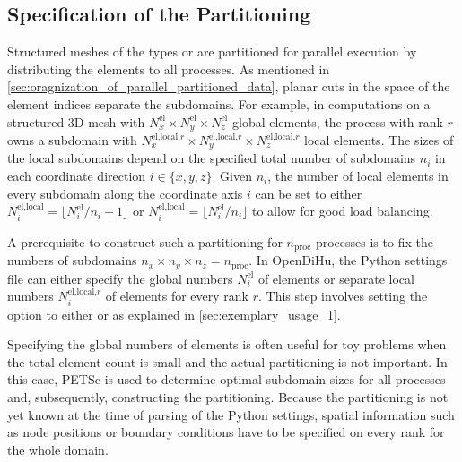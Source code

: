 \subsection{Specification of the Partitioning}\label{sec:algorithm_for_partitioning_and_sampling}

Structured meshes of the types  or  are partitioned for parallel execution by distributing the elements to all processes. As mentioned in \cref{sec:oragnization_of_parallel_partitioned_data}, planar cuts in the space of the element indices separate the subdomains. For example, in computations on a structured 3D mesh with $N_x^\text{el} \times N_y^\text{el} \times N_z^\text{el}$ global elements, the process with rank $r$ owns a subdomain with
$N_x^{\text{el,local,}r} \times N_y^{\text{el,local,}r} \times N_z^{\text{el,local,}r}$ local elements.
The sizes of the local subdomains depend on the specified total number of subdomains $n_i$ in each coordinate direction $i \in \{x,y,z\}$.
Given $n_i$, the number of local elements in every subdomain along the coordinate axis $i$ can be set to either $N_i^{\text{el,local}} = \lfloor N^\text{el}_i/n_i+1\rfloor$ or $N_i^{\text{el,local}} = \lfloor N^\text{el}_i/n_i \rfloor$ to allow for good load balancing.

A prerequisite to construct such a partitioning for $n_\text{proc}$ processes is to fix the numbers of subdomains $n_x \times n_y \times n_z = n_\text{proc}$. In OpenDiHu, the Python settings file can either specify the global numbers $N_i^\text{el}$ of elements or separate local numbers $N_i^{\text{el,local,}r}$ of elements for every rank $r$. This step involves setting the option  to either  or  as explained in \cref{sec:exemplary_usage_1}.

Specifying the global numbers of elements is often useful for toy problems when the total element count is small and the actual partitioning is not important. In this case, PETSc is used to determine optimal subdomain sizes for all processes and, subsequently, constructing the partitioning. Because the partitioning is not yet known at the time of parsing of the Python settings, spatial information such as node positions or boundary conditions have to be specified on every rank for the whole domain.

